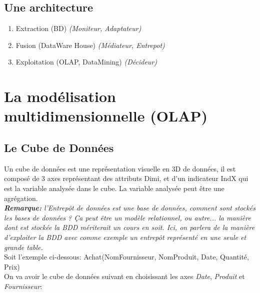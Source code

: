 \documentclass[a4paper,11pt]{article}
\begin{document}
		\subsection{Une architecture}
		\begin{enumerate}
			\item Extraction (BD) \emph{(Moniteur, Adaptateur)}
			\item Fusion (DataWare House) \emph{(Médiateur, Entrepot)}
			\item Exploitation (OLAP, DataMining) \emph{(Décideur)}
		\end{enumerate}
			
	\section{La modélisation multidimensionnelle (OLAP)}
		\subsection{Le Cube de Données}
		Un cube de données est une représentation visuelle en 3D de données, il est composé de 3 axes représentant des attributs Dimi, et d'un indicateur IndX qui est la variable analysée dans le cube. La variable analysée peut être une agrégation.\\
		
		\emph{\textbf{Remarque:} l’Entrepôt de données est une base de données, comment sont stockés les bases de données ? Ça peut être un modèle relationnel, ou autre... la manière dont est stockée la BDD mériterait un cours en soit. Ici, on parlera de la manière d'exploiter la BDD avec comme exemple un entrepôt représenté en une seule et grande table.}\\
		
		Soit l'exemple ci-dessous: Achat(NomFournisseur, NomProduit, Date, Quantité, Prix)\\
		
		On va avoir le cube de données suivant en choisissant les axes \emph{Date}, \emph{Produit} et \emph{Fournisseur}:\\
		
\end{document}
